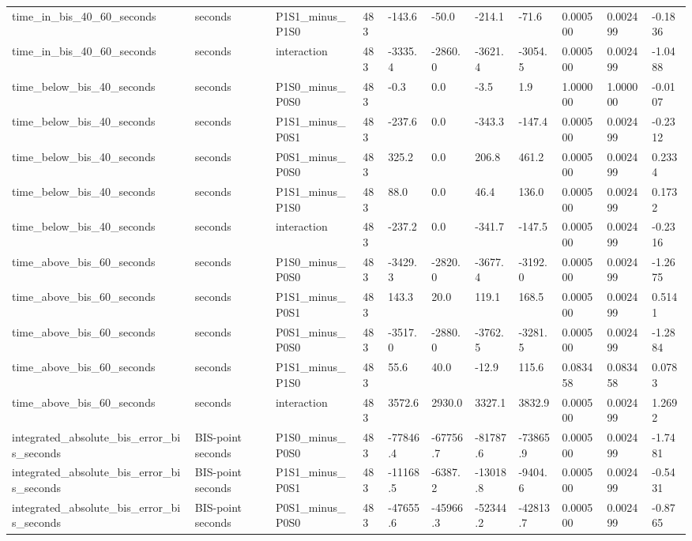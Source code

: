 \begin{tabular}{lllllllllll}
time\_in\_bis\_40\_60\_seconds & seconds & P1S1\_minus\_P1S0 & 483 & -143.6 & -50.0 & -214.1 & -71.6 & 0.000500 & 0.002499 & -0.1836 \\
time\_in\_bis\_40\_60\_seconds & seconds & interaction & 483 & -3335.4 & -2860.0 & -3621.4 & -3054.5 & 0.000500 & 0.002499 & -1.0488 \\
time\_below\_bis\_40\_seconds & seconds & P1S0\_minus\_P0S0 & 483 & -0.3 & 0.0 & -3.5 & 1.9 & 1.000000 & 1.000000 & -0.0107 \\
time\_below\_bis\_40\_seconds & seconds & P1S1\_minus\_P0S1 & 483 & -237.6 & 0.0 & -343.3 & -147.4 & 0.000500 & 0.002499 & -0.2312 \\
time\_below\_bis\_40\_seconds & seconds & P0S1\_minus\_P0S0 & 483 & 325.2 & 0.0 & 206.8 & 461.2 & 0.000500 & 0.002499 & 0.2334 \\
time\_below\_bis\_40\_seconds & seconds & P1S1\_minus\_P1S0 & 483 & 88.0 & 0.0 & 46.4 & 136.0 & 0.000500 & 0.002499 & 0.1732 \\
time\_below\_bis\_40\_seconds & seconds & interaction & 483 & -237.2 & 0.0 & -341.7 & -147.5 & 0.000500 & 0.002499 & -0.2316 \\
time\_above\_bis\_60\_seconds & seconds & P1S0\_minus\_P0S0 & 483 & -3429.3 & -2820.0 & -3677.4 & -3192.0 & 0.000500 & 0.002499 & -1.2675 \\
time\_above\_bis\_60\_seconds & seconds & P1S1\_minus\_P0S1 & 483 & 143.3 & 20.0 & 119.1 & 168.5 & 0.000500 & 0.002499 & 0.5141 \\
time\_above\_bis\_60\_seconds & seconds & P0S1\_minus\_P0S0 & 483 & -3517.0 & -2880.0 & -3762.5 & -3281.5 & 0.000500 & 0.002499 & -1.2884 \\
time\_above\_bis\_60\_seconds & seconds & P1S1\_minus\_P1S0 & 483 & 55.6 & 40.0 & -12.9 & 115.6 & 0.083458 & 0.083458 & 0.0783 \\
time\_above\_bis\_60\_seconds & seconds & interaction & 483 & 3572.6 & 2930.0 & 3327.1 & 3832.9 & 0.000500 & 0.002499 & 1.2692 \\
integrated\_absolute\_bis\_error\_bis\_seconds & BIS-point seconds & P1S0\_minus\_P0S0 & 483 & -77846.4 & -67756.7 & -81787.6 & -73865.9 & 0.000500 & 0.002499 & -1.7481 \\
integrated\_absolute\_bis\_error\_bis\_seconds & BIS-point seconds & P1S1\_minus\_P0S1 & 483 & -11168.5 & -6387.2 & -13018.8 & -9404.6 & 0.000500 & 0.002499 & -0.5431 \\
integrated\_absolute\_bis\_error\_bis\_seconds & BIS-point seconds & P0S1\_minus\_P0S0 & 483 & -47655.6 & -45966.3 & -52344.2 & -42813.7 & 0.000500 & 0.002499 & -0.8765 \\

\end{tabular}
